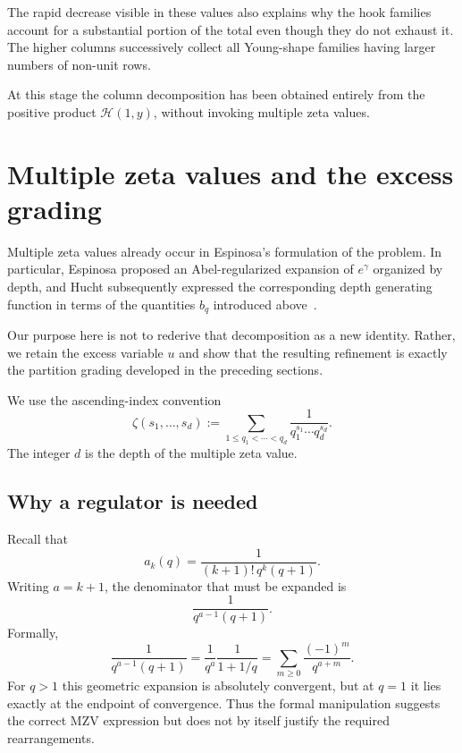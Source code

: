 \documentclass[11pt]{article}
\theoremstyle{definition}
\begin{document}
The rapid decrease visible in these values also explains why the hook
families account for a substantial portion of the total even though
they do not exhaust it. The higher columns successively collect all Young-shape families
having larger numbers of non-unit rows.

At this stage the column decomposition has been obtained entirely
from the positive product $\mathscr H(1,y)$, without invoking multiple
zeta values.

\section{Multiple zeta values and the excess grading}
\label{sec:mzv}

Multiple zeta values already occur in Espinosa's formulation of the
problem.  In particular, Espinosa proposed an Abel-regularized
expansion of $e^\gamma$ organized by depth, and Hucht subsequently
expressed the corresponding depth generating function in terms of
the quantities $b_q$ introduced above~\cite{EspinosaMO2026,HuchtMO2026}.

Our purpose here is not to rederive that decomposition as a new
identity.  Rather, we retain the excess variable $u$ and show that
the resulting refinement is exactly the partition grading developed
in the preceding sections.

We use the ascending-index convention
\begin{equation}\label{eq:mzv-convention}
 \zeta(s_1,\ldots,s_d)
 :=
 \sum_{1\leq q_1<\cdots<q_d}
 \frac{1}
 {q_1^{s_1}\cdots q_d^{s_d}}.
\end{equation}
The integer $d$ is the depth of the multiple zeta value.

\subsection{Why a regulator is needed}

Recall that
\[
        a_k(q)
        =
        \frac{1}{(k+1)!\,q^k(q+1)}.
\]
Writing $a=k+1$, the denominator that must be expanded is
\[
        \frac{1}{q^{a-1}(q+1)}.
\]
Formally,
\[
 \frac{1}{q^{a-1}(q+1)}
 =
 \frac1{q^a}\frac1{1+1/q}
 =
 \sum_{m\geq0}\frac{(-1)^m}{q^{a+m}}.
\]
For $q>1$ this geometric expansion is absolutely convergent, but at
$q=1$ it lies exactly at the endpoint of convergence.  Thus the
formal manipulation suggests the correct MZV expression but does not
by itself justify the required rearrangements.
\end{document}
